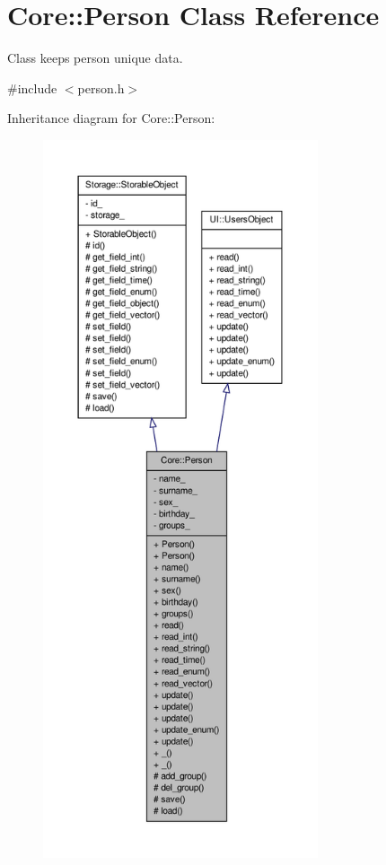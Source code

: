\hypertarget{classCore_1_1Person}{
\section{Core::Person Class Reference}
\label{d9/d71/classCore_1_1Person}
}


Class keeps person unique data.  




{\ttfamily \#include $<$person.h$>$}



Inheritance diagram for Core::Person:
\nopagebreak
\begin{figure}[H]
\begin{center}
\leavevmode
\includegraphics[height=600pt]{d0/dc4/classCore_1_1Person__inherit__graph}
\end{center}
\end{figure}


